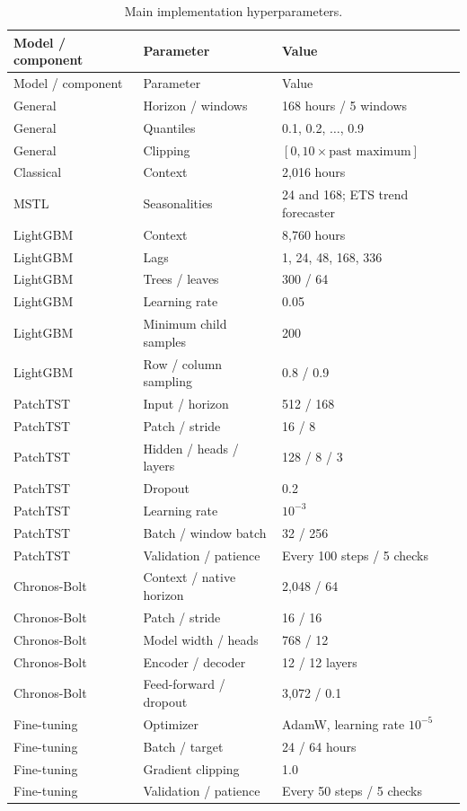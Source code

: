 \documentclass[11pt,a4paper]{article}
\begin{document}
\begin{longtable}{@{}p{35mm}p{43mm}p{74mm}@{}}
\caption{Main implementation hyperparameters.}\label{tab:hyperparams}\\
\toprule
Model / component & Parameter & Value\\
\midrule
\endfirsthead
\toprule
Model / component & Parameter & Value\\
\midrule
\endhead
General & Horizon / windows & 168 hours / 5 windows\\
General & Quantiles & 0.1, 0.2, $\ldots$, 0.9\\
General & Clipping & $[0,10\times\text{past maximum}]$\\
Classical & Context & 2,016 hours\\
MSTL & Seasonalities & 24 and 168; ETS trend forecaster\\
LightGBM & Context & 8,760 hours\\
LightGBM & Lags & 1, 24, 48, 168, 336\\
LightGBM & Trees / leaves & 300 / 64\\
LightGBM & Learning rate & 0.05\\
LightGBM & Minimum child samples & 200\\
LightGBM & Row / column sampling & 0.8 / 0.9\\
PatchTST & Input / horizon & 512 / 168\\
PatchTST & Patch / stride & 16 / 8\\
PatchTST & Hidden / heads / layers & 128 / 8 / 3\\
PatchTST & Dropout & 0.2\\
PatchTST & Learning rate & $10^{-3}$\\
PatchTST & Batch / window batch & 32 / 256\\
PatchTST & Validation / patience & Every 100 steps / 5 checks\\
Chronos-Bolt & Context / native horizon & 2,048 / 64\\
Chronos-Bolt & Patch / stride & 16 / 16\\
Chronos-Bolt & Model width / heads & 768 / 12\\
Chronos-Bolt & Encoder / decoder & 12 / 12 layers\\
Chronos-Bolt & Feed-forward / dropout & 3,072 / 0.1\\
Fine-tuning & Optimizer & AdamW, learning rate $10^{-5}$\\
Fine-tuning & Batch / target & 24 / 64 hours\\
Fine-tuning & Gradient clipping & 1.0\\
Fine-tuning & Validation / patience & Every 50 steps / 5 checks\\
\bottomrule
\end{longtable}
\end{document}
